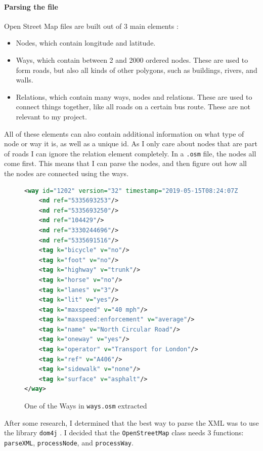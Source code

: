 \documentclass[11pt,twoside,a4paper]{article}
\begin{document}
\paragraph{Parsing the file}
Open Street Map files are built out of 3 main elements \cite{osmwikipage}:
\begin{itemize}
    \item Nodes, which contain longitude and latitude. 
    \item Ways, which contain between 2 and 2000 ordered nodes. These are used to form roads, but also all kinds of other polygons, such as buildings, rivers, and walls. 
    \item Relations, which contain many ways, nodes and relations. These are used to connect things together, like all roads on a certain bus route. These are not relevant to my project.
\end{itemize}
All of these elements can also contain additional information on what type of node or way it is, as well as a unique id. 
As I only care about nodes that are part of roads I can ignore the relation element completely. In a \texttt{.osm} file, the nodes all come first. This means that I can parse the nodes, 
and then figure out how all the nodes are connected using the ways.\\
\begin{figure}[t]
    \begin{lstlisting}[language=XML]
<way id="1202" version="32" timestamp="2019-05-15T08:24:07Z" uid="7105697" user="_Garrison_" changeset="70264933">
    <nd ref="5335693253"/>
    <nd ref="5335693250"/>
    <nd ref="104429"/>
    <nd ref="3330244696"/>
    <nd ref="5335691516"/>
    <tag k="bicycle" v="no"/>
    <tag k="foot" v="no"/>
    <tag k="highway" v="trunk"/>
    <tag k="horse" v="no"/>
    <tag k="lanes" v="3"/>
    <tag k="lit" v="yes"/>
    <tag k="maxspeed" v="40 mph"/>
    <tag k="maxspeed:enforcement" v="average"/>
    <tag k="name" v="North Circular Road"/>
    <tag k="oneway" v="yes"/>
    <tag k="operator" v="Transport for London"/>
    <tag k="ref" v="A406"/>
    <tag k="sidewalk" v="none"/>
    <tag k="surface" v="asphalt"/>
</way>
\end{lstlisting}
\caption{One of the Ways in \texttt{ways.osm} extracted}
\label{North Circular}
\end{figure}
After some research, I determined that the best way to parse the XML was to use the library \texttt{dom4j} \cite{dom4jsite}. I decided that the \texttt{OpenStreetMap} class needs 3 functions: \texttt{parseXML}, \texttt{processNode}, and \texttt{processWay}.
\end{document}
